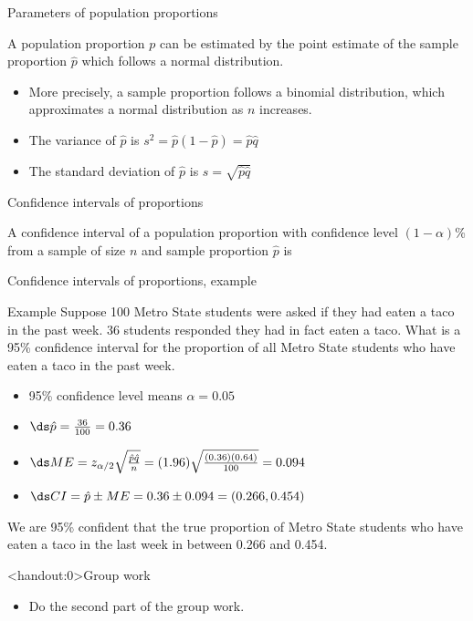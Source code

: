 \documentclass[xcolor=table, aspectratio=169, bigger]{beamer}
\begin{document}
\begin{frame}{Parameters of population proportions}
\begin{block}{}
A population proportion $p$ can be estimated by the point estimate of the sample proportion $\hat p$ which follows a normal distribution.
\begin{itemize}
\pause\item More precisely, a sample proportion follows a binomial distribution, which approximates a normal distribution as $n$ increases.
\pause\item The variance of $\hat p$ is $s^2 = \hat p (1-\hat p) = \hat p \hat q$
\pause\item The standard deviation of $\hat p$ is $s = \sqrt{\hat p \hat q}$
\end{itemize}
\end{block}
\end{frame}

\begin{frame}{Confidence intervals of proportions}
\begin{block}{}
A confidence interval of a population proportion with confidence level $(1-\alpha)$\% from a sample of size $n$ and sample proportion $\hat p$ is\\ \smallskip
{}
\end{block}
\end{frame}


\begin{frame}{Confidence intervals of proportions, example}
\begin{exampleblock}{Example}
Suppose 100 Metro State students were asked if they had eaten a taco in the past week. 36 students responded they had in fact eaten a taco. What is a 95\% confidence interval for the proportion of all Metro State students who have eaten a taco in the past week.
\begin{itemize}
\pause\item 95\% confidence level means $\alpha = 0.05$
\pause\item $\ds \hat p = \frac {36}{100} = 0.36$
\pause\item $\ds ME = z_{\alpha/2}\sqrt{\frac {\hat p \hat q}{n}} = (1.96)\sqrt{\frac {(0.36)(0.64)}{100}} = 0.094$
\pause\item $\ds CI = \hat p \pm ME = 0.36 \pm 0.094 = (0.266, 0.454)$
\end{itemize}
\pause We are 95\% confident that the true proportion of Metro State students who have eaten a taco in the last week in between 0.266 and 0.454.
\end{exampleblock}
\end{frame}


\begin{frame}<handout:0>{Group work}
\begin{block}{}
\large
\begin{itemize}
\item Do the second part of the group work.
\end{itemize}
\end{block}
\end{frame}
\end{document}

